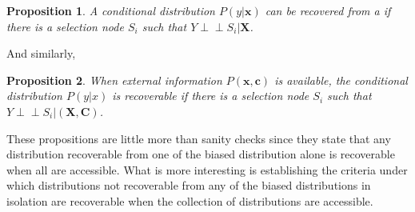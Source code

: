 \documentclass[12pt]{article}
\newtheorem{proposition}{Proposition}[section]
\theoremstyle{definition}
\newcommand{\dsep}{\perp \!\!\!\perp}
\begin{document}
\begin{proposition}
A conditional distribution $P(y | \mathbf{x})$ can be recovered from a if there is a selection node $S_i$ such that $Y \dsep S_i | \mathbf{X} $.
\end{proposition}
And similarly,

\begin{proposition}
When external information $P(\mathbf{x}, \mathbf{c})$ is available, the conditional distribution $P(y | x)$ is recoverable if there is a selection node $S_i$ such that $Y \dsep S_i | (\mathbf{X}, \mathbf{C})$.
\end{proposition} 
 
These propositions are little more than sanity checks since they state that any distribution recoverable from one of the biased distribution alone is recoverable when all are accessible. What is more interesting is establishing the criteria under which distributions not recoverable from any of the biased distributions in isolation are recoverable when the collection of distributions are accessible. 
\end{document}
